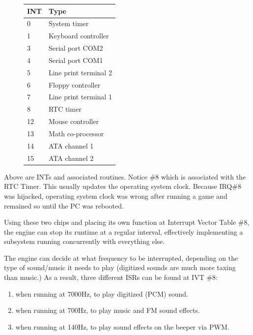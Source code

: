 \par
\begin{figure}[H]
\centering
\begin{tabularx}{\textwidth}{ X X  }
  \toprule
  \textbf{INT} & \textbf{Type} \\ \bottomrule
0 & System timer \\
1 & Keyboard controller \\
3 & Serial port COM2 \\ 
4 & Serial port COM1 \\
5 & Line print terminal 2 \\
6 & Floppy controller \\
7 & Line print terminal 1 \\
8 & RTC timer \\
12 & Mouse controller \\
13 & Math co-processor \\
14 & ATA channel 1 \\
15 & ATA channel 2  \\
\bottomrule
\end{tabularx}

\end{figure}
Above are INTs and associated routines. Notice \#8 which is associated with the RTC Timer. This usually updates the operating system clock. Because IRQ\#8 was hijacked, operating system clock was wrong after running a game and remained so until the PC was rebooted.\\
\par
Using these two chips and placing its own function at Interrupt Vector Table \#8, the engine can stop its runtime at a regular interval, effectively implementing a subsystem running concurrently with everything else.\\
\par
The engine can decide at what frequency to be interrupted, depending on the type of sound/music it needs to play (digitized sounds are much more taxing than music.) As a result, three different ISRs can be found at IVT \#8: 
\begin{enumerate}
\item {} when running at 7000Hz, to play digitized (PCM) sound.
\item {} when running at 700Hz, to play music and FM sound effects.
\item {} when running at 140Hz, to play sound effects on the beeper via PWM.
\end{enumerate}
\par



